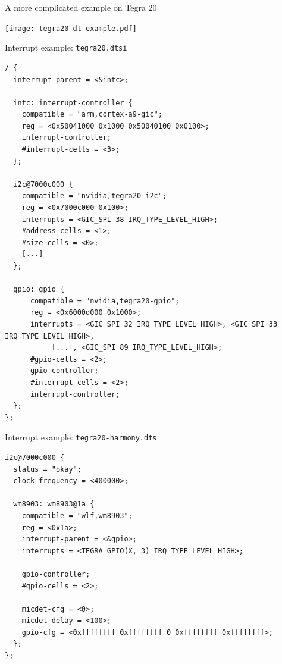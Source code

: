 \documentclass[obeyspaces,spaces,hyphens]{beamer}
\begin{document}
\begin{frame}{A more complicated example on Tegra 20}
  \begin{center}
    \texttt{[image: tegra20-dt-example.pdf]}
  \end{center}
\end{frame}

\begin{frame}[fragile]{Interrupt example: {\tt tegra20.dtsi}}
  \begin{block}{}
    \begin{verbatim}
/ {
  interrupt-parent = <&intc>;

  intc: interrupt-controller {
    compatible = "arm,cortex-a9-gic";
    reg = <0x50041000 0x1000 0x50040100 0x0100>;
    interrupt-controller;
    #interrupt-cells = <3>;
  };

  i2c@7000c000 {
    compatible = "nvidia,tegra20-i2c";
    reg = <0x7000c000 0x100>;
    interrupts = <GIC_SPI 38 IRQ_TYPE_LEVEL_HIGH>;
    #address-cells = <1>;
    #size-cells = <0>;
    [...]
  };

  gpio: gpio {
      compatible = "nvidia,tegra20-gpio";
      reg = <0x6000d000 0x1000>;
      interrupts = <GIC_SPI 32 IRQ_TYPE_LEVEL_HIGH>, <GIC_SPI 33 IRQ_TYPE_LEVEL_HIGH>,
           [...], <GIC_SPI 89 IRQ_TYPE_LEVEL_HIGH>;
      #gpio-cells = <2>;
      gpio-controller;
      #interrupt-cells = <2>;
      interrupt-controller;
  };
};
\end{verbatim}
\end{block}
\end{frame}

\begin{frame}[fragile]{Interrupt example: {\tt tegra20-harmony.dts}}
\begin{block}{}
  \begin{verbatim}
i2c@7000c000 {
  status = "okay";
  clock-frequency = <400000>;

  wm8903: wm8903@1a {
    compatible = "wlf,wm8903";
    reg = <0x1a>;
    interrupt-parent = <&gpio>;
    interrupts = <TEGRA_GPIO(X, 3) IRQ_TYPE_LEVEL_HIGH>;

    gpio-controller;
    #gpio-cells = <2>;

    micdet-cfg = <0>;
    micdet-delay = <100>;
    gpio-cfg = <0xffffffff 0xffffffff 0 0xffffffff 0xffffffff>;
  };
};
\end{verbatim}
\end{block}
\end{frame}
\end{document}
